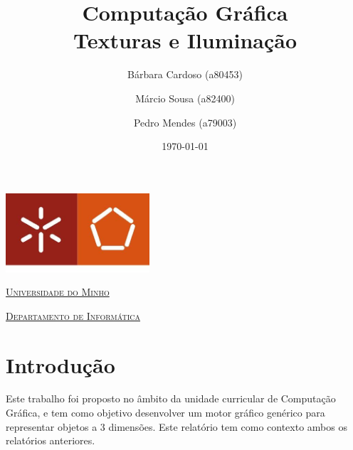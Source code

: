 \documentclass[a4paper]{article}
\begin{document}
\title{Computação Gráfica\\ Texturas e Iluminação}
\author{Bárbara Cardoso (a80453) \and Márcio Sousa (a82400)
\and Pedro Mendes (a79003)}
\date{\today}

\begin{titlepage}

    \thispagestyle{empty}
    \begin{center}
        \begin{minipage}{0.75\linewidth}
            \centering
            \includegraphics[width=0.4\textwidth]{eng.jpeg}\par\vspace{1cm}
            \vspace{1.5cm}
            \href{https://www.uminho.pt/PT}
            {\scshape\LARGE Universidade do Minho} \par
            \vspace{1cm}
            \href{https://www.di.uminho.pt/}
            {\scshape\Large Departamento de Informática} \par
            \vspace{1.5cm}

            \maketitle
        \end{minipage}
    \end{center}

\end{titlepage}

\tableofcontents

\pagebreak

\section{Introdução}
Este trabalho foi proposto no âmbito da unidade curricular de Computação
Gráfica, e tem como objetivo desenvolver um motor gráfico genérico para
representar objetos a 3 dimensões. Este relatório tem como contexto ambos os
relatórios anteriores.
\end{document}
